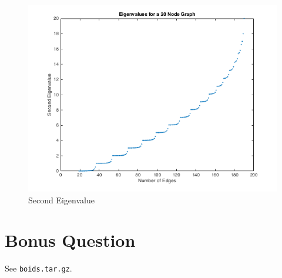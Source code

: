 \documentclass{article}
\begin{document}
\begin{figure}[h!]
\caption{Second Eigenvalue}
\centering
\includegraphics[width=\textwidth]{./Eigenvalues-edges.png}
\end{figure}


\section*{Bonus Question}
See \texttt{boids.tar.gz}. 
\end{document}
